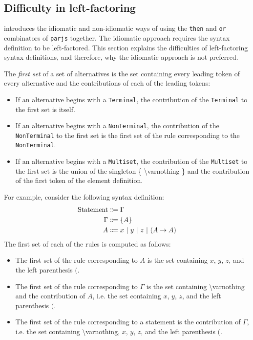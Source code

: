 \subsection{Difficulty in left-factoring}
\label{syntax:factorisation}
 introduces the idiomatic and non-idiomatic ways of using the \lstinline{then} and \lstinline{or} combinators of \lstinline{parjs} together. The idiomatic approach requires the syntax definition to be left-factored. This section explains the difficulties of left-factoring syntax definitions, and therefore, why the idiomatic approach is not preferred.

\begin{definition}
    The \textit{first set} of a set of alternatives is the set containing every leading token of every alternative and the contributions of each of the leading tokens:
    \begin{itemize}
        \item If an alternative begins with a \lstinline{Terminal}, the contribution of the \lstinline{Terminal} to the first set is itself.
        \item If an alternative begins with a \lstinline{NonTerminal}, the contribution of the \lstinline{NonTerminal} to the first set is the first set of the rule corresponding to the \lstinline{NonTerminal}.
        \item If an alternative begins with a \lstinline{Multiset}, the contribution of the \lstinline{Multiset} to the first set is the union of the singleton \{ \textbackslash varnothing \} and the contribution of the first token of the element definition.
    \end{itemize}
\end{definition}

For example, consider the following syntax definition:
\begin{align*}
    \text{Statement} &\Coloneqq \Gamma \\
    \Gamma &\Coloneqq \{ A \} \\
    A &\Coloneqq x \ |\  y \ |\  z \ |\  (A \to A)
\end{align*}
The first set of each of the rules is computed as follows:
\begin{itemize}
    \item The first set of the rule corresponding to $A$ is the set containing $x$, $y$, $z$, and the left parenthesis $($.
    \item The first set of the rule corresponding to $\Gamma$ is the set containing \textbackslash varnothing and the contribution of $A$, i.e. the set containing $x$, $y$, $z$, and the left parenthesis $($.
    \item The first set of the rule corresponding to a statement is the contribution of $\Gamma$, i.e. the set containing \textbackslash varnothing, $x$, $y$, $z$, and the left parenthesis $($.
\end{itemize}

